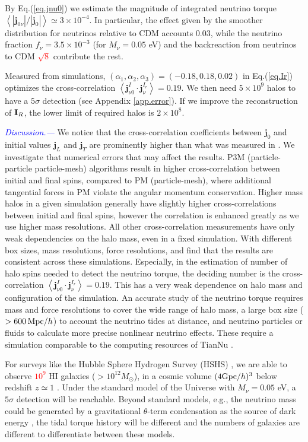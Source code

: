 \documentclass[aps,prd,twocolumn,amsmath,amssymb,amsfont,superscriptaddress]{revtex4-1}
\newcommand{\bs}{\boldsymbol}
\newcommand{\I}{\bold{I}}
\newcommand{\spin}{\bs{j}}
\newcommand{\tcb}{\textcolor{blue}}
\newcommand{\tcr}{\textcolor{red}}
\begin{document}
By Eq.(\ref{eq.jnu0}) we estimate the magnitude of integrated neutrino torque $\left\langle|\spin_{0\nu}|/|\spin_0|\right\rangle\simeq 3\times10^{-4}$. In particular, the effect given by the smoother distribution for neutrinos relative to CDM accounts 0.03, while the neutrino fraction $f_\nu=3.5\times 10^{-3}$ (for $M_\nu=0.05$ eV) and the backreaction from neutrinos to CDM \tcr{$\sqrt{8}$} contribute the rest.

Measured from simulations, $(\alpha_1,\alpha_2,\alpha_3)=(-0.18,0.18,0.02)$ in Eq.(\ref{eq.Ir}) optimizes the cross-correlation $\left\langle\spin^I_{\nu 0}\cdot\spin^{I_r}_\nu\right\rangle=0.19$. We then need $5\times 10^9$ halos to have a $5\sigma$ detection (see Appendix \ref{app.error}). If we improve the reconstruction of $\I_R$, the lower limit of required halos is $2\times 10^8$.

\tcb{\textit{Discussion.---}} 
We notice that the cross-correlation coefficients between $\spin_0$ and initial values $\spin_L$ and $\spin_T$ are prominently higher than what was measured in \citep{2000ApJ...532L...5L}. We investigate that numerical errors that may affect the results. P3M (particle-particle particle-mesh) algorithms result in higher cross-correlation between initial and final spins, compared to PM (particle-mesh), where additional tangential forces in PM violate the angular momentum conservation. Higher mass halos in a given simulation generally have slightly higher cross-correlations between initial and final spins, however the correlation is enhanced greatly as we use higher mass resolutions. All other cross-correlation measurements have only weak dependencies on the halo mass, even in a fixed simulation. With different box sizes, mass resolutions, force resolutions, and find that the results are consistent across these simulations. Especially, in the estimation of number of halo spins needed to detect the neutrino torque, the deciding number is the cross-correlation $\left\langle\spin^I_{\nu 0}\cdot\spin^{I_r}_\nu\right\rangle=0.19$. This has a very weak dependence on halo mass and configuration of the simulation. An accurate study of the neutrino torque requires mass and force resolutions to cover the wide range of halo mass, a large box size ($>600\,{\rm Mpc}/h$) to account the neutrino tides at distance, and neutrino particles or fluids to calculate more precise nonlinear neutrino effects. These require a simulation comparable to the computing resources of TianNu \citep{2017RAA....17...85E}.

For surveys like the Hubble Sphere Hydrogen Survey (HSHS) \citep{2006astro.ph..6104P}, we are able to observe \tcr{$10^9$} HI galaxies ($>10^{12}M_\odot$), 
in a cosmic volume $(4{\rm Gpc}/h)^3$ below redshift $z\simeq 1$   \citep{2004MNRAS.350.1210Z}. 
Under the standard model of the Universe with $M_\nu=0.05$ eV, a $5\sigma$ detection will be reachable.
Beyond standard models, e.g., the neutrino mass could be generated by a gravitational $\theta$-term condensation as the source of dark energy \citep{2016PhRvD..93k3002D}, the tidal torque history will be different and the numbers of galaxies are different to differentiate between these models.
\end{document}
